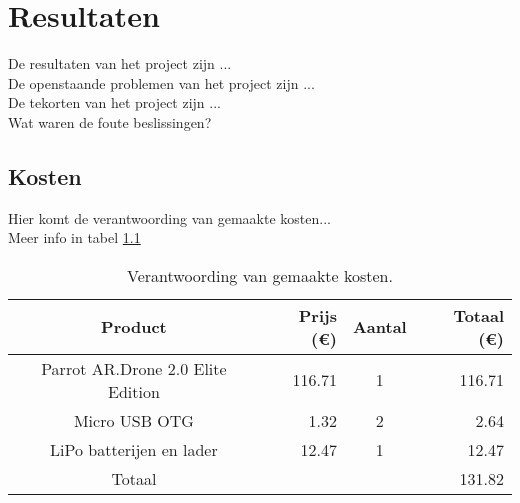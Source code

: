 \chapter{Resultaten}
De resultaten van het project zijn ...\\

De openstaande problemen van het project zijn ...\\

De tekorten van het project zijn ...\\

Wat waren de foute beslissingen?

\section{Kosten}
Hier komt de verantwoording van gemaakte kosten...\\

Meer info in tabel \ref{tab:kosten}
\begin{table}[p]
\centering
\begin{tabular}{ |c|r|c|r| } \hline
Product & Prijs (\euro{}) & Aantal & Totaal (\euro{}) \\ [.5ex] \hline \hline
Parrot AR.Drone 2.0 Elite Edition & 116.71 & 1 & 116.71 \\ \hline
Micro USB OTG & 1.32 & 2 & 2.64 \\ \hline
LiPo batterijen en lader & 12.47 & 1 & 12.47 \\ \hline
Totaal & & & 131.82 \\ \hline
\end{tabular}
\caption[Kosten]{Verantwoording van gemaakte kosten.}
\label{tab:kosten}
\end{table}